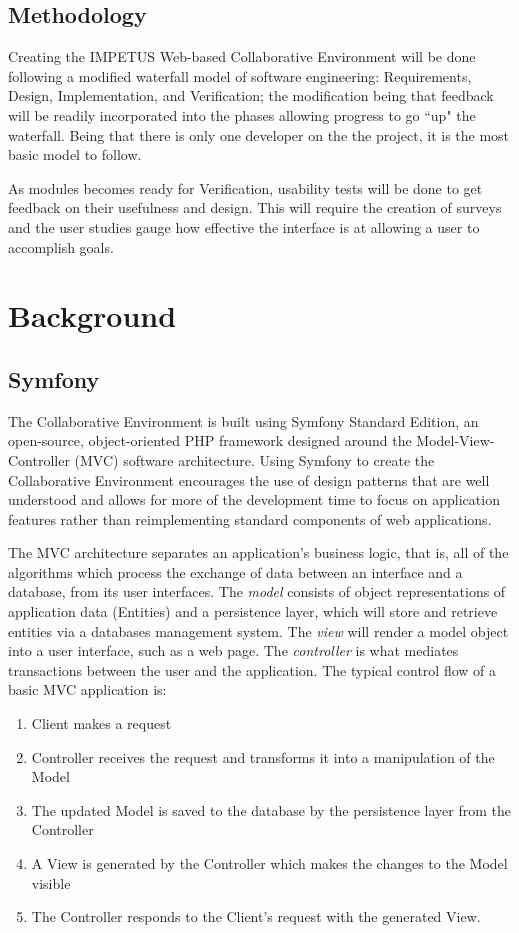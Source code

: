 \documentclass[letterpaper,12pt]{report}
\begin{document}
\subsection*{Methodology}

Creating the IMPETUS Web-based Collaborative Environment will be done following a modified waterfall model of software engineering: Requirements, Design, Implementation, and Verification; the modification being that feedback will be readily incorporated into the phases allowing progress to go ``up" the waterfall. Being that there is only one developer on the the project, it is the most basic model to follow.

As modules becomes ready for Verification, usability tests will be done to get feedback on their usefulness and design. This will require the creation of surveys and the user studies gauge how effective the interface is at allowing a user to accomplish goals.

\section*{Background}
\subsection*{Symfony}
The Collaborative Environment is built using Symfony Standard Edition, an open-source, object-oriented PHP framework designed around the Model-View-Controller (MVC) software architecture. Using Symfony to create the Collaborative Environment encourages the use of design patterns that are well understood and allows for more of the development time to focus on application features rather than reimplementing standard components of web applications.

The MVC architecture separates an application's business logic, that is, all of the algorithms which process the exchange of data between an interface and a database, from its user interfaces. The \emph{model} consists of object representations of application data (Entities) and a persistence layer, which will store and retrieve entities via a databases management system. The \emph{view} will render a model object into a user interface, such as a web page. The \emph{controller} is what mediates transactions between the user and the application. The typical control flow of a basic MVC application is:

\begin{singlespacing}
\begin{enumerate}
	\item Client makes a request
	\item Controller receives the request and transforms it into a manipulation of the Model
	\item The updated Model is saved to the database by the persistence layer from the Controller
	\item A View is generated by the Controller which makes the changes to the Model visible
	\item The Controller responds to the Client's request with the generated View.
\end{enumerate}
\end{singlespacing}
\end{document}
